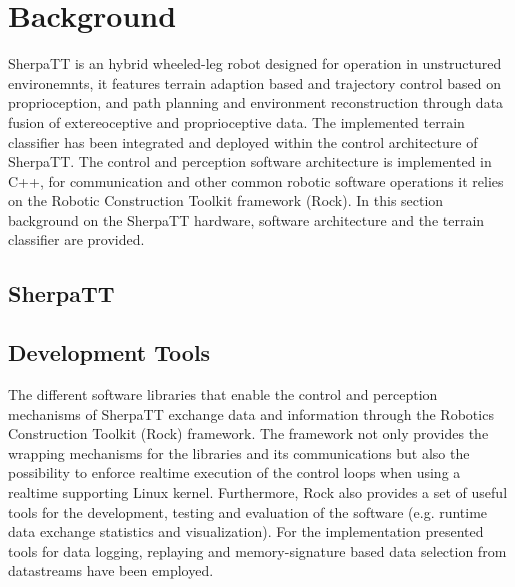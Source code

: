 \documentclass{article}
\begin{document}

\section{Background}


SherpaTT is an hybrid wheeled-leg robot designed for operation in unstructured environemnts, it features terrain adaption based and trajectory control based on proprioception, and path planning and environment reconstruction through data fusion of extereoceptive and proprioceptive data.
The implemented terrain classifier has been integrated and deployed within the control architecture of SherpaTT. 
The control and perception software architecture is implemented in C++, for communication and other common robotic software operations it relies on the Robotic Construction Toolkit framework (Rock). 
In this section background on the SherpaTT hardware, software architecture and the terrain classifier are provided.


\subsection{SherpaTT}


\subsection{Development Tools}

The different software libraries that enable the control and perception mechanisms of SherpaTT exchange data and information through the Robotics Construction Toolkit (Rock) framework.
The framework not only provides the wrapping mechanisms for the libraries and its communications but also the possibility to enforce realtime execution of the control loops when using a realtime supporting Linux kernel.
Furthermore, Rock also provides a set of useful tools for the development, testing and evaluation of the software (e.g. runtime data exchange statistics and visualization). 
For the implementation presented tools for data logging, replaying and memory-signature based data selection from datastreams have been employed.
\end{document}
